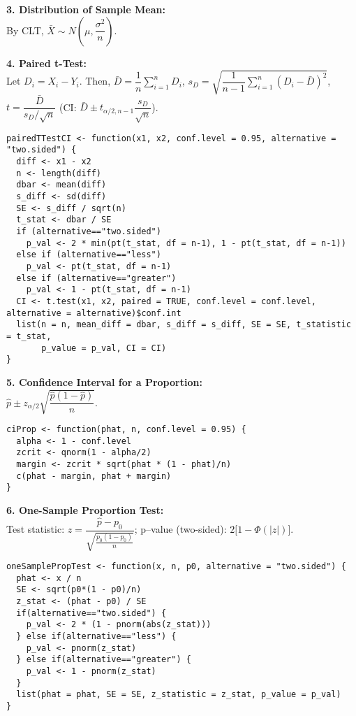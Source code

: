 \documentclass[10pt]{article}
\begin{document}
\noindent\textbf{3. Distribution of Sample Mean:} \\
By CLT, $\bar{X}\sim N\left(\mu,\dfrac{\sigma^2}{n}\right)$.

 

\noindent\textbf{4. Paired t-Test:} \\
Let $D_i=X_i-Y_i$. Then, $\bar{D}=\dfrac{1}{n}\sum_{i=1}^{n}D_i$, \quad
$s_D=\sqrt{\dfrac{1}{n-1}\sum_{i=1}^{n}(D_i-\bar{D})^2}$, \quad 
$t=\dfrac{\bar{D}}{s_D/\sqrt{n}}$ \quad (CI: $\bar{D}\pm t_{\alpha/2,n-1}\dfrac{s_D}{\sqrt{n}}$).

 

 
\begin{lstlisting}
pairedTTestCI <- function(x1, x2, conf.level = 0.95, alternative = "two.sided") {
  diff <- x1 - x2
  n <- length(diff)
  dbar <- mean(diff)
  s_diff <- sd(diff)
  SE <- s_diff / sqrt(n)
  t_stat <- dbar / SE
  if (alternative=="two.sided")
    p_val <- 2 * min(pt(t_stat, df = n-1), 1 - pt(t_stat, df = n-1))
  else if (alternative=="less")
    p_val <- pt(t_stat, df = n-1)
  else if (alternative=="greater")
    p_val <- 1 - pt(t_stat, df = n-1)
  CI <- t.test(x1, x2, paired = TRUE, conf.level = conf.level, alternative = alternative)$conf.int
  list(n = n, mean_diff = dbar, s_diff = s_diff, SE = SE, t_statistic = t_stat,
       p_value = p_val, CI = CI)
}
\end{lstlisting}

 

\noindent\textbf{5. Confidence Interval for a Proportion:} \\
$\hat{p}\pm z_{\alpha/2}\sqrt{\dfrac{\hat{p}(1-\hat{p})}{n}}$.

 

 
\begin{lstlisting}
ciProp <- function(phat, n, conf.level = 0.95) {
  alpha <- 1 - conf.level
  zcrit <- qnorm(1 - alpha/2)
  margin <- zcrit * sqrt(phat * (1 - phat)/n)
  c(phat - margin, phat + margin)
}
\end{lstlisting}

 

\noindent\textbf{6. One-Sample Proportion Test:} \\
Test statistic: $z=\dfrac{\hat{p}-p_0}{\sqrt{\frac{p_0(1-p_0)}{n}}}$; \quad p--value (two-sided): $2\bigl[1-\Phi(|z|)\bigr]$.

 

 
\begin{lstlisting}
oneSamplePropTest <- function(x, n, p0, alternative = "two.sided") {
  phat <- x / n
  SE <- sqrt(p0*(1 - p0)/n)
  z_stat <- (phat - p0) / SE
  if(alternative=="two.sided") {
    p_val <- 2 * (1 - pnorm(abs(z_stat)))
  } else if(alternative=="less") {
    p_val <- pnorm(z_stat)
  } else if(alternative=="greater") {
    p_val <- 1 - pnorm(z_stat)
  }
  list(phat = phat, SE = SE, z_statistic = z_stat, p_value = p_val)
}
\end{lstlisting}
\end{document}
